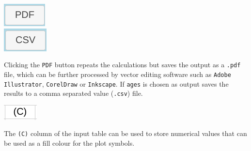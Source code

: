 \begin{refsection}
\noindent\begin{minipage}[t]{.15\textwidth}
\strut\vspace*{-\baselineskip}\newline
\includegraphics[width=.55\textwidth]{../figures/PDF.png}\\
\includegraphics[width=.55\textwidth]{../figures/CSV.png}\\
\end{minipage}
\begin{minipage}[t]{.85\textwidth}
Clicking the \texttt{PDF} button repeats the calculations but saves
the output as a \texttt{.pdf} file, which can be further processed by
vector editing software such as \texttt{Adobe Illustrator},
\texttt{CorelDraw} or \texttt{Inkscape}. If \texttt{ages} is chosen as
output saves the results to a comma separated value (\texttt{.csv})
file.\\
\end{minipage}

\noindent\begin{minipage}[t]{.15\textwidth}
\strut\vspace*{-\baselineskip}\newline
\includegraphics[width=.55\textwidth]{../figures/C.png}\\
\end{minipage}
\begin{minipage}[t]{.85\textwidth}
The \texttt{(C)} column of the input table can be used to store
numerical values that can be used as a fill colour for the plot
symbols.\\
\end{minipage}


\end{refsection}
